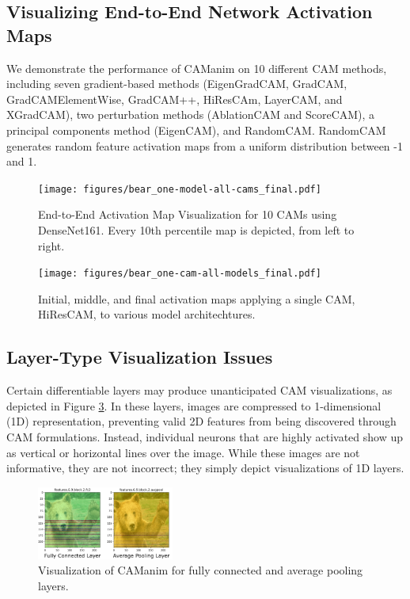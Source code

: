 \documentclass[10pt, conference, compsocconf]{IEEEtran}
\begin{document}
\subsection{Visualizing End-to-End Network Activation Maps}
\label{sec:activationmaps}

We demonstrate the performance of CAManim on 10 different CAM methods, including seven gradient-based methods (EigenGradCAM, GradCAM, GradCAMElementWise, GradCAM++, HiResCAm, LayerCAM, and XGradCAM), two perturbation methods (AblationCAM and ScoreCAM), a principal components method (EigenCAM), and RandomCAM. RandomCAM generates random feature activation maps from a uniform distribution between -1 and 1.

\begin{figure}
    \centering
    \texttt{[image: figures/bear\_one-model-all-cams\_final.pdf]}
    \caption{End-to-End Activation Map Visualization for 10 CAMs using DenseNet161. Every 10th percentile map is depicted, from left to right.}
    \label{fig:all-cams}
\end{figure}


\begin{figure}
    \centering
    \texttt{[image: figures/bear\_one-cam-all-models\_final.pdf]}
    \caption{Initial, middle, and final activation maps applying a single CAM, HiResCAM, to various model architechtures.}
    \label{fig:my_label}
\end{figure}

\subsection{Layer-Type Visualization Issues}
\label{sec:visissues}

Certain differentiable layers may produce unanticipated CAM visualizations, as depicted in Figure \ref{fig:bad_layers}. In these layers, images are compressed to 1-dimensional (1D) representation, preventing valid 2D features from being discovered through CAM formulations. Instead, individual neurons that are highly activated show up as vertical or horizontal lines over the image. While these images are not informative, they are not incorrect; they simply depict visualizations of 1D layers.

\begin{figure}
    \centering
    \includegraphics[width=0.4\textwidth]{figures/bad_layers.png}
    \caption{Visualization of CAManim for fully connected and average pooling layers.}
    \label{fig:bad_layers}
\end{figure}
\end{document}
